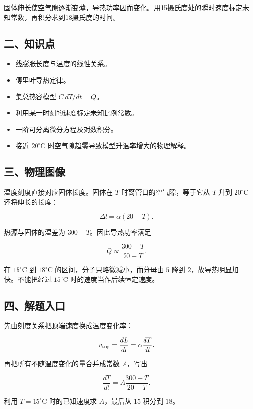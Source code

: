 \documentclass[12pt,a4paper,UTF8]{ctexart}
\newcommand{\tightlist}{\setlength{\itemsep}{0pt}\setlength{\parskip}{0pt}}
\begin{document}
固体伸长使空气隙逐渐变薄，导热功率因而变化。用15摄氏度处的瞬时速度标定未知常数，再积分求到18摄氏度的时间。

\subsection{二、知识点}\label{ux4e8cux77e5ux8bc6ux70b9-6}

\begin{itemize}
\tightlist
\item
  线膨胀长度与温度的线性关系。
\item
  傅里叶导热定律。
\item
  集总热容模型 \(C\ dT/dt=\dot Q\)。
\item
  利用某一时刻的速度标定未知比例常数。
\item
  一阶可分离微分方程及对数积分。
\item
  接近 \(20^\circ\mathrm C\) 时空气隙趋零导致模型升温率增大的物理解释。
\end{itemize}

\subsection{三、物理图像}\label{ux4e09ux7269ux7406ux56feux50cf-6}

温度刻度直接对应固体长度。固体在 \(T\) 时离管口的空气隙，等于它从 \(T\)
升到 \(20^\circ\mathrm C\) 还将伸长的长度：

\[\Delta l=\alpha(20-T).\]

热源与固体的温差为 \(300-T\)。因此导热功率满足

\[\dot Q\propto\frac{300-T}{20-T}.\]

在 \(15^\circ\mathrm C\) 到 \(18^\circ\mathrm C\)
的区间，分子只略微减小，而分母由 \(5\) 降到
\(2\)，故导热明显加快。不能把经过 \(15^\circ\mathrm C\)
时的速度当作后续恒定速度。

\subsection{四、解题入口}\label{ux56dbux89e3ux9898ux5165ux53e3-6}

先由刻度关系把顶端速度换成温度变化率：

\[v_{\rm top}=\frac{dL}{dt}=\alpha\frac{dT}{dt}.\]

再把所有不随温度变化的量合并成常数 \(A\)，写出

\[\frac{dT}{dt}=A\frac{300-T}{20-T}.\]

利用 \(T=15^\circ\mathrm C\) 时的已知速度求 \(A\)，最后从 \(15\) 积分到
\(18\)。
\end{document}

